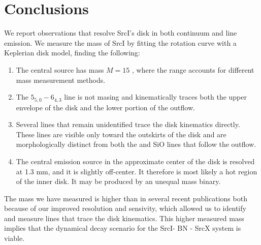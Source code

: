 \documentclass[twocolumn]{aastex61}
\newcommand{\sourcei}{SrcI\xspace}
\newcommand{\sourcex}{SrcX\xspace}
\begin{document}
\section{Conclusions}
\label{sec:conclusions}
We report observations that resolve \sourcei's disk in both continuum
and line emission.  We measure the mass of \sourcei by fitting the 
rotation curve with a Keplerian disk model, finding the following:

\begin{enumerate}
    \item The central source has mass $M=15$ \msun, where the range
        accounts for different mass measurement methods.
    \item The \water $5_{5,0}-6_{4,3}$ line is not masing and kinematically
        traces both the upper envelope of the disk and the lower portion of
        the outflow.
    \item Several lines that remain unidentified trace the disk kinematics
        directly.  These lines are visible only toward the outskirts of the
        disk and are morphologically distinct from both the \water and SiO
        lines that follow the outflow.
    \item The central emission source in the approximate center of the disk
        is resolved at 1.3 mm, and it is slightly off-center.  It therefore is
        most likely a hot region of the inner disk.  It may be produced
        by an unequal mass binary.
\end{enumerate}

The mass we have measured is higher than in several recent publications both
because of our improved resolution and sensivity, which allowed us to identify
and measure lines that trace the disk kinematics.  This higher measured mass
implies that the dynamical decay scenario for the \sourcei - BN - \sourcex
system is viable.


\end{document}
